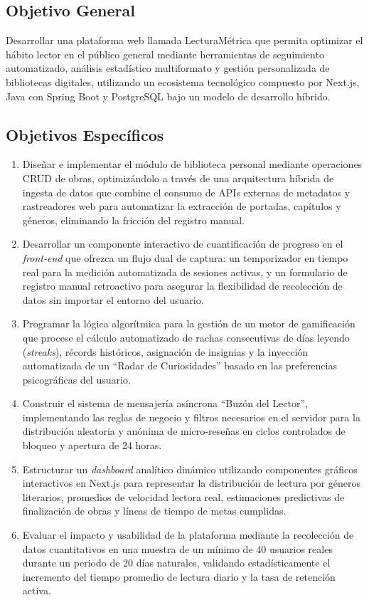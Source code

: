 \documentclass[12pt, atypical, journal]{article}
\begin{document}
\subsection{Objetivo General}
Desarrollar una plataforma web llamada LecturaMétrica que permita optimizar el hábito lector en el público general mediante herramientas de seguimiento automatizado, análisis estadístico multiformato y gestión personalizada de bibliotecas digitales, utilizando un ecosistema tecnológico compuesto por Next.js, Java con Spring Boot y PostgreSQL bajo un modelo de desarrollo híbrido.

\subsection{Objetivos Específicos}
\begin{enumerate}
   \item Diseñar e implementar el módulo de biblioteca personal mediante operaciones CRUD de obras, optimizándolo a través de una arquitectura híbrida de ingesta de datos que combine el consumo de APIs externas de metadatos y rastreadores web para automatizar la extracción de portadas, capítulos y géneros, eliminando la fricción del registro manual.
   \item Desarrollar un componente interactivo de cuantificación de progreso en el \textit{front-end} que ofrezca un flujo dual de captura: un temporizador en tiempo real para la medición automatizada de sesiones activas, y un formulario de registro manual retroactivo para asegurar la flexibilidad de recolección de datos sin importar el entorno del usuario.
   \item Programar la lógica algorítmica para la gestión de un motor de gamificación que procese el cálculo automatizado de rachas consecutivas de días leyendo (\textit{streaks}), récords históricos, asignación de insignias y la inyección automatizada de un ``Radar de Curiosidades'' basado en las preferencias psicográficas del usuario.
   \item Construir el sistema de mensajería asíncrona ``Buzón del Lector'', implementando las reglas de negocio y filtros necesarios en el servidor para la distribución aleatoria y anónima de micro-reseñas en ciclos controlados de bloqueo y apertura de 24 horas.
   \item Estructurar un \textit{dashboard} analítico dinámico utilizando componentes gráficos interactivos en Next.js para representar la distribución de lectura por géneros literarios, promedios de velocidad lectora real, estimaciones predictivas de finalización de obras y líneas de tiempo de metas cumplidas.
   \item Evaluar el impacto y usabilidad de la plataforma mediante la recolección de datos cuantitativos en una muestra de un mínimo de 40 usuarios reales durante un periodo de 20 días naturales, validando estadísticamente el incremento del tiempo promedio de lectura diario y la tasa de retención activa.
\end{enumerate}
\end{document}
